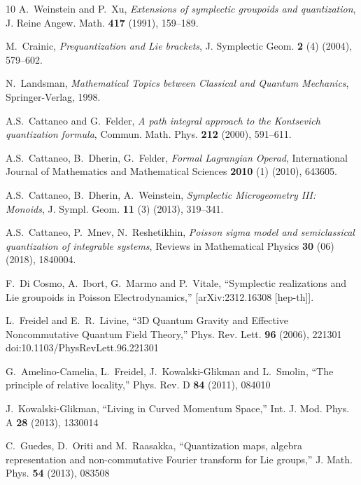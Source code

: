 \documentclass[12pt,a4paper]{article}
\numberwithin{equation}{section}
\theoremstyle{definition}
\begin{document}
{\begin{thebibliography}{10}
A.~Weinstein and P.~Xu, \emph{Extensions of symplectic groupoids and quantization}, J. Reine Angew. Math. \textbf{417} (1991), 159--189.

M.~Crainic, \emph{Prequantization and Lie brackets}, J. Symplectic Geom. \textbf{2} (4) (2004), 579--602.

N.~Landsman, \emph{Mathematical Topics between Classical and Quantum Mechanics}, Springer-Verlag, 1998.

A.S.~Cattaneo and G.~Felder, \emph{A path integral approach to the Kontsevich quantization formula}, Commun. Math. Phys. \textbf{212} (2000), 591--611.

A.S.~Cattaneo, B.~Dherin, G.~Felder, \emph{Formal Lagrangian Operad}, International Journal of Mathematics and Mathematical Sciences \textbf{2010} (1) (2010), 643605.

A.S.~Cattaneo, B.~Dherin, A.~Weinstein, \emph{Symplectic Microgeometry III: Monoids}, J. Sympl. Geom. \textbf{11} (3) (2013), 319--341.

A.S.~Cattaneo, P.~Mnev, N.~Reshetikhin, \emph{Poisson sigma model and semiclassical quantization of integrable systems}, Reviews in Mathematical Physics \textbf{30} (06) (2018), 1840004.

F.~Di Cosmo, A.~Ibort, G.~Marmo and P.~Vitale,
``Symplectic realizations and Lie groupoids in Poisson Electrodynamics,''
[arXiv:2312.16308 [hep-th]].

L.~Freidel and E.~R.~Livine,
``3D Quantum Gravity and Effective Noncommutative Quantum Field Theory,''
Phys. Rev. Lett. \textbf{96} (2006), 221301
doi:10.1103/PhysRevLett.96.221301

G.~Amelino-Camelia, L.~Freidel, J.~Kowalski-Glikman and L.~Smolin,
``The principle of relative locality,''
Phys. Rev. D \textbf{84} (2011), 084010

J.~Kowalski-Glikman,
``Living in Curved Momentum Space,''
Int. J. Mod. Phys. A \textbf{28} (2013), 1330014

C.~Guedes, D.~Oriti and M.~Raasakka,
``Quantization maps, algebra representation and non-commutative Fourier transform for Lie groups,''
J. Math. Phys. \textbf{54} (2013), 083508


\end{thebibliography}}
\end{document}
